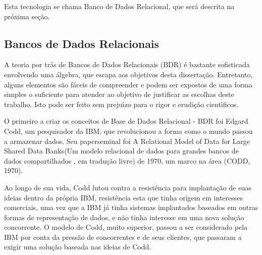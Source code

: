 \documentclass[
12pt,		%
openright,	%
twoside,  %
a4paper,			%
chapter=TITLE,		%
english,			%
french,				%
spanish,			%
brazil				%
]{USPSC-classe/USPSC}
\begin{document}
Esta tecnologia se chama \textquotedbl Banco de Dados Relacional\textquotedbl , que ser\'a descrita na pr\'oxima se\c{c}\~ao.

















\subsection[Bancos de Dados Relacionais]{Bancos de Dados Relacionais}\label{Bancos de Dados Relacionais}
A teoria por tr\'as de Bancos de Dados Relacionais (BDR) \'e bastante sofisticada envolvendo uma \'algebra, que escapa aos objetivos desta disserta\c{c}\~ao. Entretanto, alguns elementos s\~ao f\'aceis de compreender e podem ser expostos  de uma forma simples o suficiente para atender ao objetivo de justificar as escolhas deste trabalho. Isto pode ser feito sem preju\'{\i}zo para o rigor e erudi\c{c}\~ao cient\'{\i}ficos.

















O primeiro a criar os conceitos de Base de Dados Relacional - BDR foi Edgard Codd, um pesquisador da IBM, que revolucionou a forma como o mundo passou a armazenar dados. Seu \textquotedbl paper\textquotedbl  seminal foi  \textquotedbl A Relational Model of Data for Large Shared Data Banks\textquotedbl  (\textquotedbl  Um modelo relacional de dados para grandes bancos de dados compartilhados \textquotedbl , em tradu\c{c}\~ao livre) de 1970, um marco na \'area (CODD, 1970).

















Ao longo de sua vida, Codd lutou contra a resist\^encia para implanta\c{c}\~ao de suas ideias dentro da pr\'opria IBM, resist\^encia esta que tinha origem em interesses comerciais, uma vez que a IBM j\'a tinha sistemas implantados baseados em outras formas de representa\c{c}\~ao de dados, e n\~ao tinha interesse em uma nova solu\c{c}\~ao concorrente. O modelo de Codd, muito superior, passou a ser considerado pela IBM por conta da press\~ao de concorrentes e de seus clientes, que passaram a exigir uma solu\c{c}\~ao baseada nas ideias de Codd.
\end{document}

